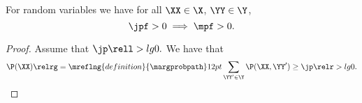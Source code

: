 \begin{proposition}
  For random variables 
  we have for all $\XX \in \X$, $\YY \in \Y$,
  $$\jpf > 0 \implies \mpf > 0.$$%
\end{proposition}

\begin{proof}
  Assume that $\jp \rell > lg 0.$
  We have that
  $$\P(\XX) \relrg = \mreflng{definition}{\margprobpath} 12pt \sum_{\YY' \in \Y}\P(\XX, \YY') \ge \jp \relr > lg 0.$$%
\end{proof}
